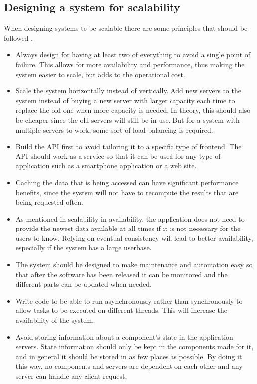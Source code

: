 \subsection{Designing a system for scalability}
When designing systems to be scalable there are some principles that should be followed \cite{ScalabilityDesignPrinciples}.
\begin{itemize}
    \item Always design for having at least two of everything to avoid a single point of failure. 
    This allows for more availability and performance, thus making the system easier to scale, but adds to the operational cost.
    \item Scale the system horizontally instead of vertically.
    Add new servers to the system instead of buying a new server with larger capacity each time to replace the old one when more capacity is needed. 
    In theory, this should also be cheaper since the old servers will still be in use. But for a system with multiple servers to work, some sort of load balancing is required.
    \item Build the API first to avoid tailoring it to a specific type of frontend. 
    The API should work as a service so that it can be used for any type of application such as a smartphone application or a web site. 
    \item Caching the data that is being accessed can have significant performance benefits, since the system will not have to recompute the results that are being requested often. 
    \item As mentioned in scalability in availability, the application does not need to provide the newest data available at all times if it is not necessary for the users to know. 
    Relying on eventual consistency will lead to better availability, especially if the system has a large userbase.
    \item The system should be designed to make maintenance and automation easy so that after the software has been released it can be monitored and the different parts can be updated when needed.
    \item Write code to be able to run asynchronously rather than synchronously to allow tasks to be executed on different threads. This will increase the availability of the system.
    \item Avoid storing information about a component's state in the application servers. 
    State information should only be kept in the components made for it, and in general it should be stored in as few places as possible. 
    By doing it this way, no components and servers are dependent on each other and any server can handle any client request. 
\end{itemize}
